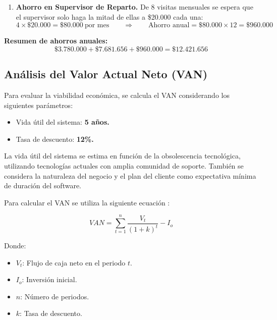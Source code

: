 \begin{enumerate}
    
    \item \textbf{Ahorro en Supervisor de Reparto.}
    De 8 visitas mensuales se espera que el supervisor solo haga la mitad de ellas a \$20.000 cada una:
    \[
    4 \times \text{\$}20.000 = \text{\$}80.000\ \text{por mes}
    \qquad\Rightarrow\qquad
    \text{Ahorro anual} = \text{\$}80.000 \times 12 = \text{\$}960.000
    \]
\end{enumerate}

\noindent\textbf{Resumen de ahorros anuales:}
\[
\text{\$}3.780.000 + \text{\$}7.681.656 + \text{\$}960.000  
= \boxed{\text{\$}12.421.656}
\]


\subsection{Análisis del Valor Actual Neto (VAN)}

Para evaluar la viabilidad económica, se calcula el VAN considerando los siguientes parámetros:

\begin{itemize}
    \item Vida útil del sistema: \textbf{5 años.}
    \item Tasa de descuento: \textbf{12\%.}
\end{itemize}

La vida útil del sistema se estima en función de la obsolescencia tecnológica, utilizando tecnologías actuales con amplia comunidad de soporte. 
También se considera la naturaleza del negocio y el plan del cliente como expectativa mínima de duración del software.

\vspace{0.8em}
\noindent Para calcular el VAN se utiliza la siguiente ecuación \textcite{investopedia}:

\[
VAN = \sum_{t=1}^{n} \frac{V_t}{(1+k)^t} - I_o
\]

\noindent Donde:
\begin{itemize}
    \item $V_t$: Flujo de caja neto en el periodo $t$.
    \item $I_o$: Inversión inicial.
    \item $n$: Número de periodos.
    \item $k$: Tasa de descuento.
\end{itemize}

